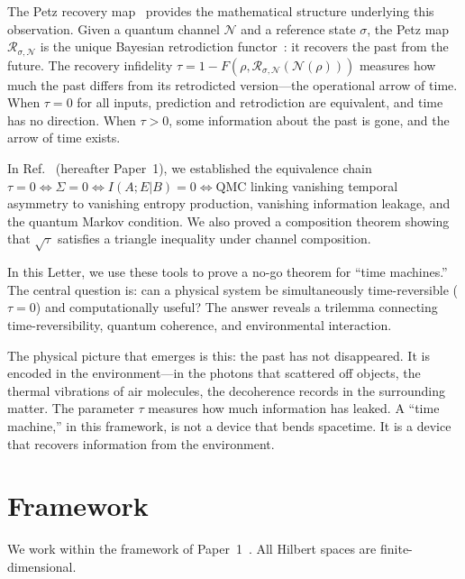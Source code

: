 \documentclass[prl,twocolumn,superscriptaddress,longbibliography,floatfix]{revtex4-2}
\newcommand{\Petz}{\mathcal{R}}
\newcommand{\chan}{\mathcal{N}}
\newcommand{\tauasym}{\tau}
\begin{document}
The Petz recovery map~\cite{Petz1986,Petz1988} provides the
mathematical structure underlying this observation.  Given a quantum
channel $\chan$ and a reference state $\sigma$, the Petz map
$\Petz_{\sigma,\chan}$ is the unique Bayesian retrodiction
functor~\cite{Parzygnat2023}: it recovers the past from the future.
The recovery infidelity
$\tauasym = 1 - F(\rho, \Petz_{\sigma,\chan}(\chan(\rho)))$ measures
how much the past differs from its retrodicted version---the
operational arrow of time.  When $\tauasym = 0$ for all inputs,
prediction and retrodiction are equivalent, and time has no direction.
When $\tauasym > 0$, some information about the past is gone, and the
arrow of time exists.

In Ref.~\cite{Huang2026a} (hereafter Paper~1), we established the
equivalence chain
$\tauasym = 0 \Leftrightarrow \Sigma = 0 \Leftrightarrow
I(A;E|B) = 0 \Leftrightarrow \text{QMC}$
linking vanishing temporal asymmetry to vanishing entropy production,
vanishing information leakage, and the quantum Markov condition.  We
also proved a composition theorem showing that $\sqrt{\tauasym}$
satisfies a triangle inequality under channel composition.

In this Letter, we use these tools to prove a no-go theorem for ``time
machines.''  The central question is: can a physical system be
simultaneously time-reversible ($\tauasym = 0$) and computationally
useful?  The answer reveals a trilemma connecting time-reversibility,
quantum coherence, and environmental interaction.

The physical picture that emerges is this: the past has not
disappeared.  It is encoded in the environment---in the photons that
scattered off objects, the thermal vibrations of air molecules, the
decoherence records in the surrounding matter.  The parameter
$\tauasym$ measures how much information has leaked.  A ``time
machine,'' in this framework, is not a device that bends spacetime.
It is a device that recovers information from the environment.

\section{Framework}
\label{sec:framework}

We work within the framework of Paper~1~\cite{Huang2026a}.  All
Hilbert spaces are finite-dimensional.
\end{document}
